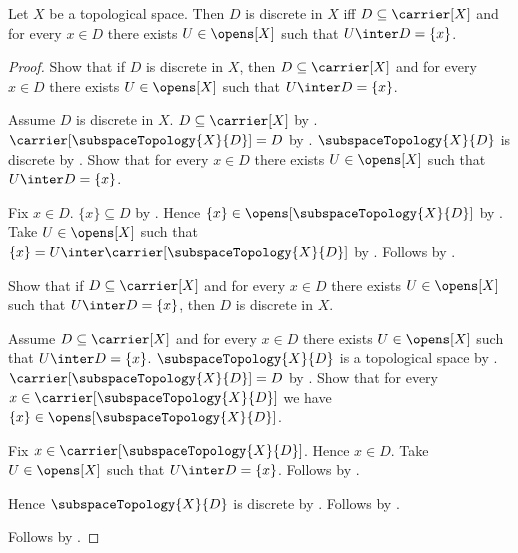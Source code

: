 \begin{theorem}\label{discrete_in_iff_ambient_open_singletons}
    Let $X$ be a topological space.
    Then $D$ is discrete in $X$ iff
        $D\subseteq\carrier[X]$ and
        for every $x\in D$ there exists $U\in\opens[X]$ such that
            $U\inter D=\{x\}$.
\end{theorem}
\begin{proof}
    Show that if $D$ is discrete in $X$, then
        $D\subseteq\carrier[X]$ and
        for every $x\in D$ there exists $U\in\opens[X]$ such that
            $U\inter D=\{x\}$.
    \begin{subproof}
        Assume $D$ is discrete in $X$.
        $D\subseteq\carrier[X]$ by .
        $\carrier[\subspaceTopology{X}{D}]=D$
            by .
        $\subspaceTopology{X}{D}$ is discrete by .
        Show that for every $x\in D$ there exists $U\in\opens[X]$ such that
            $U\inter D=\{x\}$.
        \begin{subproof}
            Fix $x\in D$.
            $\{x\}\subseteq D$ by .
            Hence $\{x\}\in\opens[\subspaceTopology{X}{D}]$
                by .
            Take $U\in\opens[X]$ such that
                $\{x\}=U\inter\carrier[\subspaceTopology{X}{D}]$
                by .
            Follows by .
        \end{subproof}
    \end{subproof}
    Show that if $D\subseteq\carrier[X]$ and
        for every $x\in D$ there exists $U\in\opens[X]$ such that
            $U\inter D=\{x\}$, then $D$ is discrete in $X$.
    \begin{subproof}
        Assume $D\subseteq\carrier[X]$ and
            for every $x\in D$ there exists $U\in\opens[X]$ such that
                $U\inter D=\{x\}$.
        $\subspaceTopology{X}{D}$ is a topological space
            by .
        $\carrier[\subspaceTopology{X}{D}]=D$
            by .
        Show that for every $x\in\carrier[\subspaceTopology{X}{D}]$ we have
            $\{x\}\in\opens[\subspaceTopology{X}{D}]$.
        \begin{subproof}
            Fix $x\in\carrier[\subspaceTopology{X}{D}]$.
            Hence $x\in D$.
            Take $U\in\opens[X]$ such that $U\inter D=\{x\}$.
            Follows by .
        \end{subproof}
        Hence $\subspaceTopology{X}{D}$ is discrete
            by .
        Follows by .
    \end{subproof}
    Follows by \auto.
\end{proof}

